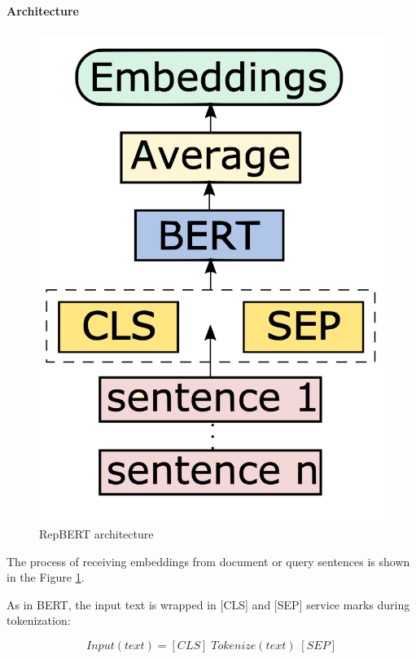 \documentclass[
    twocolumn,
]{ceurart}
\begin{document}
    \paragraph{Architecture}
    \begin{figure}[h]
        \centering
        \includegraphics[scale=0.2]{RepBERT.png}
        \caption{RepBERT architecture}
        \label{fig:RepBERT}
    \end{figure}
    The process of receiving embeddings from document or query sentences is shown
    in the Figure \ref{fig:RepBERT}.

    As in BERT\cite{BERT}, the input text is wrapped in [CLS] and [SEP] service marks
    during tokenization:

    \begin{equation}
        Input(text) = [CLS]\;Tokenize(text)\;[SEP]
    \end{equation}
\end{document}
